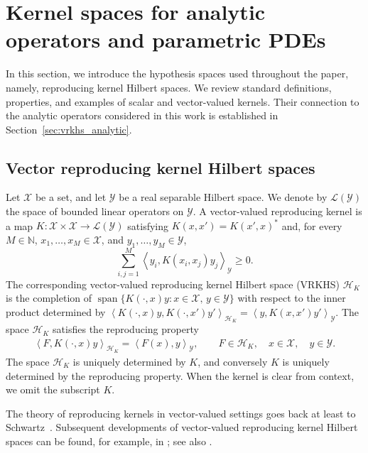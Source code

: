 \documentclass[11pt]{article}
\numberwithin{equation}{section}
\theoremstyle{plain}
\theoremstyle{definition}
\theoremstyle{remark}
\newcommand{\X}{\mathcal{X}}
\newcommand{\Hs}{\mathcal{H}}
\newcommand{\Y}{\mathcal{Y}}
\newcommand{\innerpro}[1]{\left\langle#1\right\rangle}
\begin{document}
\section{Kernel spaces for analytic operators and parametric PDEs}
\label{sec:vrkhs_main}

In this section, we introduce the hypothesis spaces used throughout the paper,
namely, reproducing kernel Hilbert spaces. We review
standard definitions, properties, and examples of scalar and vector-valued
kernels. Their connection to the analytic operators considered in this
work is established in Section~\ref{sec:vrkhs_analytic}.

\subsection{Vector reproducing kernel Hilbert spaces}
\label{subsec:kernel_def}

Let $\mathcal{X}$ be a set, and let $\mathcal{Y}$ be a real separable Hilbert
space. We denote by $\mathcal{L}(\mathcal{Y})$ the space of bounded linear
operators on $\mathcal{Y}$. A vector-valued reproducing kernel is a map
$K\colon\mathcal{X}\times\mathcal{X}\to\mathcal{L}(\mathcal{Y})$ satisfying
$K(x,x')=K(x',x)^*$ and, for every $M\in\mathbb{N}$,
$x_1,\ldots,x_M\in\mathcal{X}$, and $y_1,\ldots,y_M\in\mathcal{Y}$,
\[
\sum_{i,j=1}^M
\innerpro{y_i,K(x_i,x_j)y_j}_{\mathcal{Y}}
\geq 0.
\]
The corresponding vector-valued reproducing kernel Hilbert space (VRKHS)
$\Hs_K$ is the completion of
$\operatorname{span}\{K(\cdot,x)y:x\in\mathcal{X},\,y\in\mathcal{Y}\}$
with respect to the inner product determined by
$\innerpro{K(\cdot,x)y,K(\cdot,x')y'}_{\Hs_K}
=
\innerpro{y,K(x,x')y'}_{\mathcal{Y}}$.
The space $\Hs_K$ satisfies the reproducing property
\begin{align}\label{eq:reproducing_prop_vector}
\innerpro{F,K(\cdot,x)y}_{\Hs_K}
=
\innerpro{F(x),y}_{\Y},
\qquad
F\in\Hs_K,\quad x\in\X,\quad y\in\Y.
\end{align}
The space $\Hs_K$ is uniquely determined by $K$, and conversely $K$ is
uniquely determined by the reproducing property. When the kernel is clear
from context, we omit the subscript $K$.

The theory of reproducing kernels in vector-valued settings goes back at
least to Schwartz~\cite{schwartz1964sous}. Subsequent developments of
vector-valued reproducing kernel Hilbert spaces can be found, for example, in
\cite{carmeli2006vector,carmeli2010vector}; see also
\cite{senkene1973hilbert,kadri2016operator}.
\end{document}
